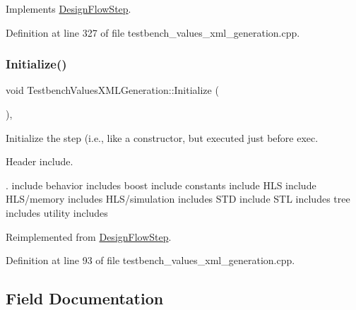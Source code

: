 Implements \hyperlink{classDesignFlowStep_a1783abe0c1d162a52da1e413d5d1ef05}{Design\+Flow\+Step}.



Definition at line 327 of file testbench\+\_\+values\+\_\+xml\+\_\+generation.\+cpp.

\mbox{\label{classTestbenchValuesXMLGeneration_a33f05a86d9767b3503b981d95ae7d604}} 
\subsubsection{\texorpdfstring{Initialize()}{Initialize()}}
{\footnotesize\ttfamily void Testbench\+Values\+X\+M\+L\+Generation\+::\+Initialize (\begin{DoxyParamCaption}{ }\end{DoxyParamCaption})\hspace{0.3cm}{\ttfamily [protected]}, {\ttfamily [virtual]}}



Initialize the step (i.\+e., like a constructor, but executed just before exec. 

Header include.

. include behavior includes boost include constants include H\+LS include H\+L\+S/memory includes H\+L\+S/simulation includes S\+TD include S\+TL includes tree includes utility includes 

Reimplemented from \hyperlink{classDesignFlowStep_a44b50683382a094976e1d432a7784799}{Design\+Flow\+Step}.



Definition at line 93 of file testbench\+\_\+values\+\_\+xml\+\_\+generation.\+cpp.



\subsection{Field Documentation}
\mbox{\label{classTestbenchValuesXMLGeneration_a60fe2f79cf05d659d1746be6b0c9c605}} 
